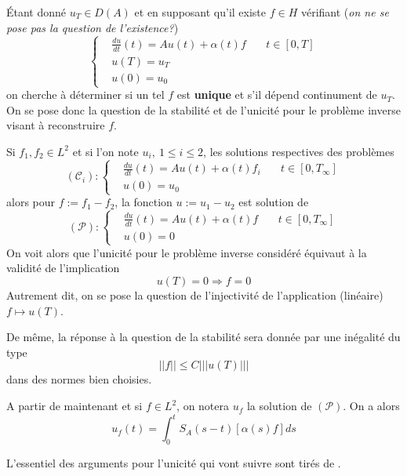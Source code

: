 \documentclass[a4paper]{book}
\begin{document}
Étant donné $u_T\in D(A)$ et en supposant qu'il existe $f\in H$ vérifiant (\emph{on ne se pose pas la question de l'existence?})
\[\left\lbrace\begin{aligned}
         & \frac{du}{dt}(t)=A u(t)+\alpha(t)f & \  & t\in[0,T] \\
         & u(T)=u_T                                            \\
         & u(0)=u_0
    \end{aligned}\right. \]
on cherche à déterminer si un tel $f$ est \textbf{unique} et s'il dépend continument de $u_T$.
On se pose donc la question de la stabilité et de l'unicité pour le problème inverse visant à reconstruire $f$.


Si $f_1, f_2\in L^2$ et si l'on note $u_i,\ 1\leq i\leq 2$, les solutions respectives des problèmes
\[(\mathcal{C}_i):\left\lbrace\begin{aligned}
         & \frac{du}{dt}(t)=A u(t)+\alpha(t)f_i & \  & t\in[0,T_\infty] \\
         & u(0)=u_0
    \end{aligned}\right. \]
alors pour $f:=f_1-f_2$, la fonction $u:=u_1-u_2$ est solution de
\[(\mathcal{P}):\left\lbrace\begin{aligned}
         & \frac{du}{dt}(t)=A u(t)+\alpha(t)f & \  & t\in[0,T_\infty] \\
         & u(0)=0
    \end{aligned}\right. \]
On voit alors que l'unicité pour le problème inverse considéré équivaut à la validité de l'implication
\[u(T)=0\Longrightarrow f=0 \]
Autrement dit, on se pose la question de l'injectivité de l'application (linéaire) $f\mapsto u(T)$.

De même, la réponse à la question de la stabilité sera donnée par une inégalité du type
\[||f||\leq C|||u(T)||| \]
dans des normes bien choisies.

A partir de maintenant et si $f\in L^2$, on notera $u_f$ la solution de $(\mathcal{P})$. On a alors
\begin{equation}
    u_f(t)=\int_{0}^{t}S_A(s-t)[\alpha(s)f]ds
\end{equation}

L'essentiel des arguments pour l'unicité qui vont suivre sont tirés de \cite{BK}.
\end{document}
